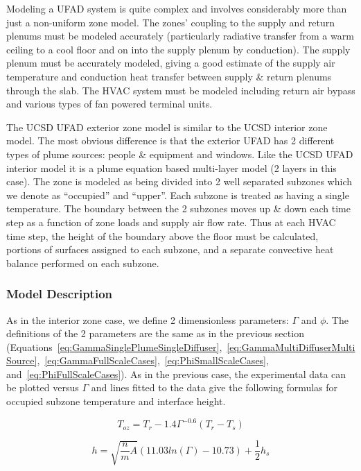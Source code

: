 Modeling a UFAD system is quite complex and involves considerably more than just a non-uniform zone model. The zones' coupling to the supply and return plenums must be modeled accurately (particularly radiative transfer from a warm ceiling to a cool floor and on into the supply plenum by conduction). The supply plenum must be accurately modeled, giving a good estimate of the supply air temperature and conduction heat transfer between supply \& return plenums through the slab. The HVAC system must be modeled including return air bypass and various types of fan powered terminal units.

The UCSD UFAD exterior zone model is similar to the UCSD interior zone model. The most obvious difference is that the exterior UFAD has 2 different types of plume sources: people \& equipment and windows. Like the UCSD UFAD interior model it is a plume equation based multi-layer model (2 layers in this case). The zone is modeled as being divided into 2 well separated subzones which we denote as ``occupied'' and ``upper''. Each subzone is treated as having a single temperature. The boundary between the 2 subzones moves up \& down each time step as a function of zone loads and supply air flow rate. Thus at each HVAC time step, the height of the boundary above the floor must be calculated, portions of surfaces assigned to each subzone, and a separate convective heat balance performed on each subzone.

\subsubsection{Model Description}\label{model-description-2-001}

As in the interior zone case, we define 2 dimensionless parameters: \(\Gamma\) and \(\phi\). The definitions of the 2 parameters are the same as in the previous section (Equations~\ref{eq:GammaSinglePlumeSingleDiffuser},~\ref{eq:GammaMultiDiffuserMultiSource},~\ref{eq:GammaFullScaleCases},~\ref{eq:PhiSmallScaleCases}, and~\ref{eq:PhiFullScaleCases}). As in the previous case, the experimental data can be plotted versus \(\Gamma\) and lines fitted to the data give the following formulas for occupied subzone temperature and interface height.

\begin{equation}
{T_{oz}} = {T_r} - 1.4{\Gamma ^{ - 0.6}}({T_r} - {T_s})
\end{equation}

\begin{equation}
h = \sqrt {\frac{n}{m}A} (11.03ln(\Gamma ) - 10.73) + \frac{1}{2}{h_s}
\label{eq:InterfaceHeightUFAD}
\end{equation}

